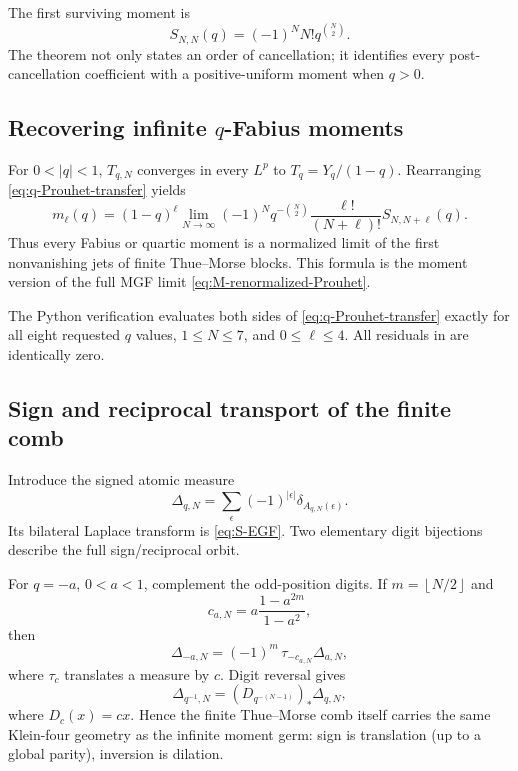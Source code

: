 \documentclass[11pt,oneside]{article}
\numberwithin{equation}{section}
\theoremstyle{definition}
\theoremstyle{remark}
\newcommand{\floor}[1]{\left\lfloor#1\right\rfloor}
\newcommand{\Dcomb}{\Delta}
\begin{document}
The first surviving moment is
\begin{equation}
 S_{N,N}(q)=(-1)^NN!q^{\binom N2}.
 \label{eq:first-surviving}
\end{equation}
The theorem not only states an order of cancellation; it identifies every
post-cancellation coefficient with a positive-uniform moment when $q>0$.

\subsection[Recovering infinite q-Fabius moments]{Recovering infinite $q$-Fabius moments}

For $0<|q|<1$, $T_{q,N}$ converges in every $L^p$ to
$T_q=Y_q/(1-q)$.  Rearranging \eqref{eq:q-Prouhet-transfer} yields
\begin{equation}
 \boxed{
 m_\ell(q)=
 (1-q)^\ell\lim_{N\to\infty}
 (-1)^Nq^{-\binom N2}
 \frac{\ell!}{(N+\ell)!}S_{N,N+\ell}(q).}
 \label{eq:moment-from-Prouhet}
\end{equation}
Thus every Fabius or quartic moment is a normalized limit of the first
nonvanishing jets of finite Thue--Morse blocks.  This formula is the moment
version of the full MGF limit \eqref{eq:M-renormalized-Prouhet}.

The Python verification evaluates both sides of
\eqref{eq:q-Prouhet-transfer} exactly for all eight requested $q$ values,
$1\le N\le7$, and $0\le\ell\le4$.  All residuals in
 are identically zero.

\subsection{Sign and reciprocal transport of the finite comb}

Introduce the signed atomic measure
\begin{equation}
 \Dcomb_{q,N}=\sum_{\epsilon}(-1)^{|\epsilon|}
 \delta_{A_{q,N}(\epsilon)}.
 \label{eq:Delta-qN}
\end{equation}
Its bilateral Laplace transform is \eqref{eq:S-EGF}.  Two elementary digit
bijections describe the full sign/reciprocal orbit.

For $q=-a$, $0<a<1$, complement the odd-position digits.  If
$m=\floor{N/2}$ and
\begin{equation}
 c_{a,N}=a\frac{1-a^{2m}}{1-a^2},
 \label{eq:c-aN}
\end{equation}
then
\begin{equation}
 \boxed{
 \Dcomb_{-a,N}=(-1)^m\,\tau_{-c_{a,N}}\Dcomb_{a,N},}
 \label{eq:comb-negative-translate}
\end{equation}
where $\tau_c$ translates a measure by $c$.  Digit reversal gives
\begin{equation}
 \boxed{
 \Dcomb_{q^{-1},N}
 =(D_{q^{-(N-1)}})_*\Dcomb_{q,N},}
 \label{eq:comb-reciprocal-dilate}
\end{equation}
where $D_c(x)=cx$.  Hence the finite Thue--Morse comb itself carries the same
Klein-four geometry as the infinite moment germ: sign is translation (up to a
global parity), inversion is dilation.
\end{document}
